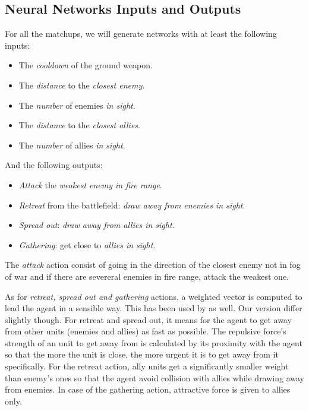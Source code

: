 \subsection{Neural Networks Inputs and Outputs}

For all the matchups, we will generate networks with at least the
following inputs:
\begin{itemize}
    \item The \emph{cooldown} of the ground weapon.
    \item The \emph{distance} to the \emph{closest enemy}.
    \item The \emph{number} of enemies \emph{in sight}.
    \item The \emph{distance} to the \emph{closest allies}.
    \item The \emph{number} of allies \emph{in sight}.
\end{itemize}

And the following outputs:
\begin{itemize}
    \item \emph{Attack} the \emph{weakest enemy in fire range}.
    \item \emph{Retreat} from the battlefield: \emph{draw away from enemies in sight}.
    \item \emph{Spread out}: \emph{draw away from allies in sight}.
    \item \emph{Gathering}: get close to \emph{allies in sight}.
\end{itemize}

The \emph{attack} action consist of going in the direction of the closest enemy not in fog of war
and if there are severeral enemies in fire range, attack the weakest one.

As for \emph{retreat, spread out and gathering} actions, a weighted vector is computed
to lead the agent in a sensible way. This has been used by \citep{WeWa12} as well.
Our version differ slightly though. For retreat and spread out, it means for the agent to
get away from other units (enemies and allies) as fast as possible. The repulsive force's strength of an unit to
get away from is calculated by its proximity with the agent so that the more the unit is close,
the more urgent it is to get away from it specifically. For the retreat action, ally units
get a significantly smaller weight than enemy's ones so that the agent avoid collision with
allies while drawing away from enemies.
In case of the gathering action, attractive force is given to allies only.

